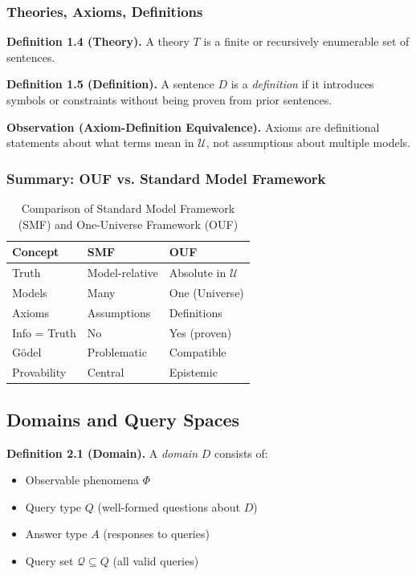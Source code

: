 \subsubsection{Theories, Axioms, Definitions}

\textbf{Definition 1.4 (Theory).} A theory $T$ is a finite or recursively enumerable set of sentences.

\textbf{Definition 1.5 (Definition).} A sentence $D$ is a \emph{definition} if it introduces symbols or constraints without being proven from prior sentences.

\textbf{Observation (Axiom-Definition Equivalence).} Axioms are definitional statements about what terms mean in $\mathcal{U}$, not assumptions about multiple models.

\subsubsection{Summary: OUF vs. Standard Model Framework}

\begin{table}[h]
\centering
\begin{tabular}{|l|l|l|}
\hline
\textbf{Concept} & \textbf{SMF} & \textbf{OUF} \\ \hline
Truth & Model-relative & Absolute in $\mathcal{U}$ \\ \hline
Models & Many & One (Universe) \\ \hline
Axioms & Assumptions & Definitions \\ \hline
Info = Truth & No & Yes (proven) \\ \hline
Gödel & Problematic & Compatible \\ \hline
Provability & Central & Epistemic \\ \hline
\end{tabular}
\caption{Comparison of Standard Model Framework (SMF) and One-Universe Framework (OUF)}
\label{tab:ouf-comparison}
\end{table}

\subsection{Domains and Query Spaces}\label{domains-and-implementations}

\textbf{Definition 2.1 (Domain).} A \emph{domain} $D$ consists of:
\begin{itemize}
\item Observable phenomena $\Phi$
\item Query type $Q$ (well-formed questions about $D$)
\item Answer type $A$ (responses to queries)
\item Query set $\mathcal{Q} \subseteq Q$ (all valid queries)
\end{itemize}


